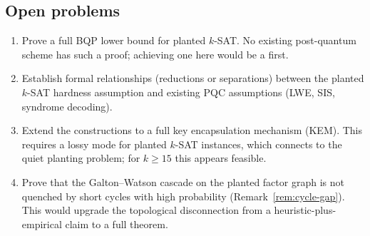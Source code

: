 \documentclass[11pt]{article}
\begin{document}
\subsection{Open problems}

\begin{enumerate}[label=(\roman*)]
\item Prove a full BQP lower bound for planted $k$-SAT.  No existing post-quantum scheme has such a proof; achieving one here would be a first.
\item Establish formal relationships (reductions or separations) between the planted $k$-SAT hardness assumption and existing PQC assumptions (LWE, SIS, syndrome decoding).
\item Extend the constructions to a full key encapsulation mechanism (KEM).  This requires a lossy mode for planted $k$-SAT instances, which connects to the quiet planting problem; for $k \geq 15$ this appears feasible.
\item Prove that the Galton--Watson cascade on the planted factor graph is not quenched by short cycles with high probability (Remark~\ref{rem:cycle-gap}).  This would upgrade the topological disconnection from a heuristic-plus-empirical claim to a full theorem.
\end{enumerate}


\end{document}

